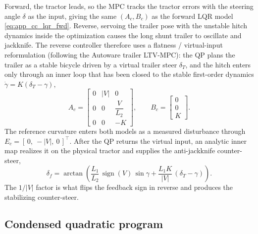 Forward, the tractor leads, so the MPC tracks the tractor errors with the steering angle
$\delta$ as the input, giving the same $(A_c, B_c)$ as the forward LQR model
\eqref{eq:app_cc_lqr_fwd}. Reverse, servoing the trailer pose with the unstable hitch
dynamics inside the optimization causes the long shunt trailer to oscillate and
jackknife. The reverse controller therefore uses a flatness / virtual-input
reformulation (following the Autoware trailer LTV-MPC): the QP plans the trailer as
a stable bicycle driven by a virtual trailer steer $\delta_T$, and the hitch enters
only through an inner loop that has been closed to the stable first-order dynamics
$\dot{\gamma} = K(\delta_T - \gamma)$,
\begin{equation}
    A_c = \begin{bmatrix}
        0 & \lvert V \rvert & 0 \\[2.2mm]
        0 & 0 & \dfrac{V}{L_2} \\[2.2mm]
        0 & 0 & -K
    \end{bmatrix},
    \qquad
    B_c = \begin{bmatrix}
        0 \\[2.2mm] 0 \\[2.2mm] K
    \end{bmatrix}.
    \label{eq:app_cc_mpc_rev}
\end{equation}
The reference curvature enters both models as a measured disturbance through
$E_c = [\,0,\ -\lvert V \rvert,\ 0\,]^\top$. After the QP returns the virtual input, an
analytic inner map realizes it on the physical tractor and supplies the anti-jackknife
counter-steer,
\begin{equation}
    \delta_f = \arctan\!\left(\frac{L_1}{L_2}\,\operatorname{sign}(V)\,\sin\gamma
    + \frac{L_1 K}{\lvert V \rvert}\,(\delta_T - \gamma)\right).
    \label{eq:app_cc_mpc_inner}
\end{equation}
The $1/\lvert V \rvert$ factor is what flips the feedback sign in reverse and produces the
stabilizing counter-steer.

\subsection{Condensed quadratic program}

